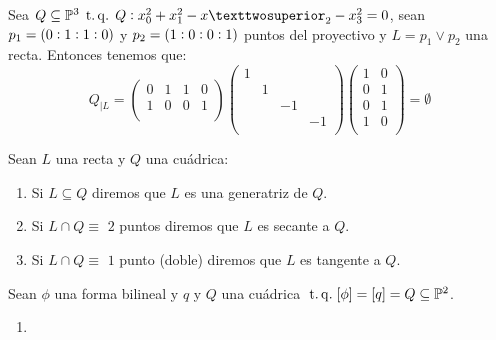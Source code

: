 \begin{example}
 Sea $Q\subseteq \Po^3 \tq Q:x^2_0 +x^2_1 -x²_2-x^2_3=0$, sean $p_1=\left( 0:1:1:0\right)$ y $p_2=\left( 
 1:0:0:1\right)$ puntos del proyectivo y $L=p_1 \vee p_2$ una recta. Entonces tenemos que:
 \[
  Q_{|L}=
  \begin{pmatrix}
   0 & 1 & 1 & 0\\
   1 & 0 & 0 & 1\\
  \end{pmatrix}
  \begin{pmatrix}
   1 & & &\\
   & 1 & &\\
   & & -1 &\\
   & & & -1\\
  \end{pmatrix}
  \begin{pmatrix}
   1 & 0\\
   0 & 1\\
   0 & 1\\
   1 & 0\\
  \end{pmatrix}
  =\emptyset
 \]
 \label{exampleLinQ}
\end{example}

\begin{defi}
 Sean $L$ una recta y $Q$ una cuádrica:
 \begin{enumerate}[(1)]
  \item Si $L\subseteq Q$ diremos que $L$ es una generatriz de $Q$.
  \item Si $L\cap Q \equiv$ $2$ puntos diremos que $L$ es secante a $Q$.
  \item Si $L\cap Q \equiv$ $1$ punto (doble) diremos que $L$ es tangente a $Q$.
 \end{enumerate}
\end{defi}

\begin{prop}
 Sean $\phi$ una forma bilineal y $q$ y $Q$ una cuádrica $\operatorname{\;t.q.\;} [\phi]=[q]=Q\subseteq \mathbb{P}^2$.
 \begin{enumerate}[(1)]
  \item 
 \end{enumerate}

\end{prop}
